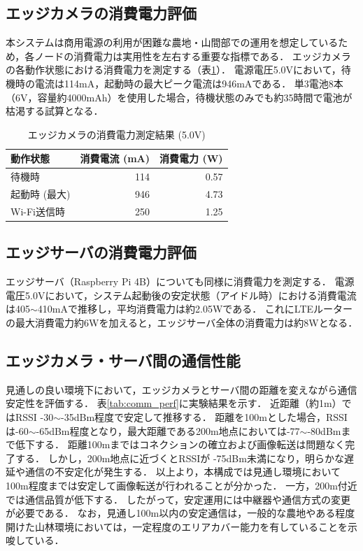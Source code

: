 \documentclass[technicalreport]{ieicej}
\begin{document}
\subsection{エッジカメラの消費電力評価}
本システムは商用電源の利用が困難な農地・山間部での運用を想定しているため，各ノードの消費電力は実用性を左右する重要な指標である．
エッジカメラの各動作状態における消費電力を測定する（表\ref{tab:camera_power}）．
電源電圧5.0Vにおいて，待機時の電流は114mA，起動時の最大ピーク電流は946mAである．
単3電池8本（6V，容量約4000mAh）を使用した場合，待機状態のみでも約35時間で電池が枯渇する試算となる．
\begin{table}[tb]
    \caption{エッジカメラの消費電力測定結果 (5.0V)}
    \label{tab:camera_power}
    \centering
    \begin{tabular}{l|r|r}
        \hline
        動作状態     & 消費電流 (mA) & 消費電力 (W) \\
        \hline \hline
        待機時      & 114       & 0.57     \\
        起動時 (最大) & 946       & 4.73     \\
        Wi-Fi送信時 & 250       & 1.25     \\
        \hline
    \end{tabular}
\end{table}

\subsection{エッジサーバの消費電力評価}
エッジサーバ（Raspberry Pi 4B）についても同様に消費電力を測定する．
電源電圧5.0Vにおいて，システム起動後の安定状態（アイドル時）における消費電流は405$\sim$410mAで推移し，平均消費電力は約2.05Wである．
これにLTEルーターの最大消費電力約6Wを加えると，エッジサーバ全体の消費電力は約8Wとなる．

\subsection{エッジカメラ・サーバ間の通信性能}
見通しの良い環境下において，エッジカメラとサーバ間の距離を変えながら通信安定性を評価する．
表\ref{tab:comm_perf}に実験結果を示す．
近距離（約1m）ではRSSI -30$\sim$-35dBm程度で安定して推移する．
距離を100mとした場合，RSSIは-60$\sim$-65dBm程度となり，最大距離である200m地点においては-77$\sim$-80dBmまで低下する．
距離100mまではコネクションの確立および画像転送は問題なく完了する．
しかし，200m地点に近づくとRSSIが -75dBm未満になり，明らかな遅延や通信の不安定化が発生する．
以上より，本構成では見通し環境において100m程度までは安定して画像転送が行われることが分かった．
一方，200m付近では通信品質が低下する．
したがって，安定運用には中継器や通信方式の変更が必要である．
なお，見通し100m以内の安定通信は，一般的な農地やある程度開けた山林環境においては，一定程度のエリアカバー能力を有していることを示唆している．
\end{document}
